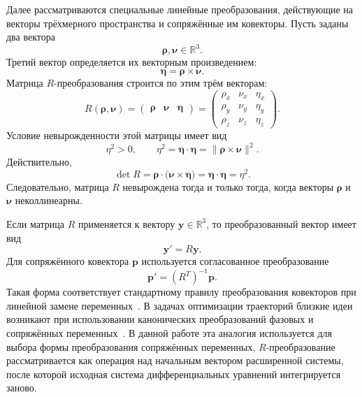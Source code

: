 Далее рассматриваются специальные линейные преобразования, действующие на векторы трёхмерного пространства и сопряжённые им ковекторы. Пусть заданы два вектора
\begin{equation}
\boldsymbol\rho,\boldsymbol\nu\in\mathbb R^3 .
\end{equation}
Третий вектор определяется их векторным произведением:
\begin{equation}
\boldsymbol\eta=\boldsymbol\rho\times\boldsymbol\nu .
\end{equation}
Матрица \(R\)-преобразования строится по этим трём векторам:
\begin{equation}
R(\boldsymbol\rho,\boldsymbol\nu)
=
\begin{pmatrix}
	\boldsymbol\rho & \boldsymbol\nu & \boldsymbol\eta
\end{pmatrix}
=
\begin{pmatrix}
	\rho_x & \nu_x & \eta_x\\
	\rho_y & \nu_y & \eta_y\\
	\rho_z & \nu_z & \eta_z
\end{pmatrix}.
\end{equation}
Условие невырожденности этой матрицы имеет вид
\begin{equation}
\eta^2>0,
\qquad
\eta^2=\boldsymbol\eta\cdot\boldsymbol\eta
=
\|\boldsymbol\rho\times\boldsymbol\nu\|^2 .
\end{equation}
Действительно,
\begin{equation}
\det R
=
\boldsymbol\rho\cdot
\bigl(\boldsymbol\nu\times\boldsymbol\eta\bigr)
=
\boldsymbol\eta\cdot\boldsymbol\eta
=
\eta^2 .
\end{equation}
Следовательно, матрица \(R\) невырождена тогда и только тогда, когда векторы
\(\boldsymbol\rho\) и \(\boldsymbol\nu\) неколлинеарны.

Если матрица \(R\) применяется к вектору \(\mathbf y\in\mathbb R^3\), то преобразованный вектор имеет вид
\begin{equation}
\mathbf y' = R\mathbf y .
\end{equation}
Для сопряжённого ковектора \(\mathbf p\) используется согласованное преобразование
\begin{equation}
\mathbf p'=(R^T)^{-1}\mathbf p .
\end{equation}
Такая форма соответствует стандартному правилу преобразования ковекторов при линейной замене переменных~\cite{marsden_ratiu_mechanics_1999}. В задачах оптимизации траекторий близкие идеи возникают при использовании канонических преобразований фазовых и сопряжённых переменных~\cite{powers_tapley_1969,haissig_mease_vinh_1992}. В данной работе эта аналогия используется для выбора формы преобразования сопряжённых переменных, \(R\)-преобразование рассматривается как операция над начальным вектором расширенной системы, после которой исходная система дифференциальных уравнений интегрируется заново.

